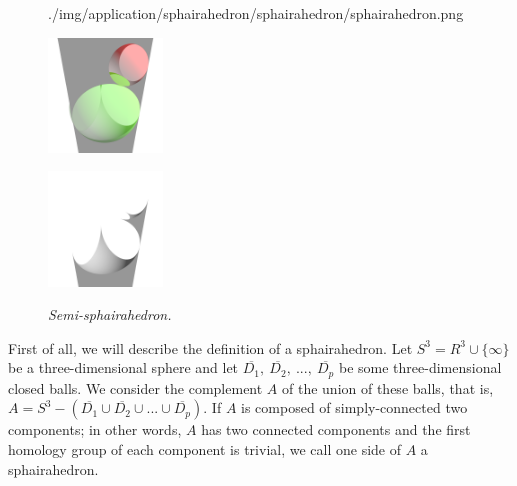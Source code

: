 \begin{figure}[h!tbp]
\begin{minipage}[t]{0.6\textwidth}
\begin{minipage}[t]{0.19\textwidth}
   {./img/application/sphairahedron/sphairahedron/sphairahedron.png}
   \label{fig:sphairahedronFinite}
  \end{minipage}
  \hspace*{\fill}
  \caption{\textit{Sphairahedron.}}
  \label{fig:sphairahedron}
 \end{minipage}
 \begin{minipage}[t]{0.4\textwidth}
  \centering
  \begin{minipage}[t]{0.19\textwidth}
   \includegraphics[width=1.2in, height=1.2in, keepaspectratio]{./img/application/sphairahedron/sphairahedron/semiSphairaAll.png}
   \label{fig:semi-sphairaAll}
  \end{minipage}
  \hspace*{\fill}
  \begin{minipage}[t]{0.19\textwidth}
   \includegraphics[width=1.2in, height=1.2in, keepaspectratio]{./img/application/sphairahedron/sphairahedron/semiSphairaHalf.png}
   \label{fig:semi-sphairaHalf}
  \end{minipage}
  \hspace*{\fill}
  \caption{\textit{Semi-sphairahedron.}}
  \label{fig:semi-sphairahedron}
 \end{minipage}
\end{figure}

First of all, we will describe the definition of a sphairahedron.
Let $S^3 = R^3 \cup \{\infty\}$ be a three-dimensional sphere and let
$\overline{D_1},~\overline{D_2},~...,~\overline{D_p}$ be some three-dimensional closed balls.
We consider the complement $A$ of the union of these balls, that is,
$A = S^3 - (\overline{D_1} \cup \overline{D_2} \cup ... \cup \overline{D_p})$.
If $A$ is composed of simply-connected two components;
in other words, $A$ has two connected components and the first homology
group of each component is trivial, we call one side of $A$
a sphairahedron.

